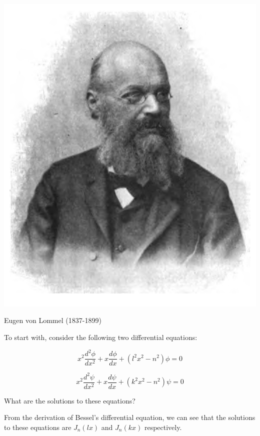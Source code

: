 \begin{marginfigure}[-.0cm]
  \includegraphics{bessel/figures/e_lommel}
  \caption{Eugen von Lommel (1837-1899)}
\end{marginfigure}

To start with, consider the following two differential equations:

\begin{equation}
x^2 \frac{d^2 \phi}{dx^2}  + x \frac{d \phi}{dx} + \left(l^2x^2 - n^2\right) \phi = 0 \label{eq-bessel-orth-1}
\end{equation} 

\begin{equation}
x^2 \frac{d^2 \psi}{dx^2}  + x \frac{d \psi}{dx} + \left(k^2x^2 - n^2\right) \psi = 0 \label{eq-bessel-orth-2}
\end{equation}

\begin{cue}
What are the solutions to these equations?  
\end{cue}

From the derivation of Bessel's differential equation, we can see that the solutions to these equations are $J_n(lx)$ and $J_n(kx)$ respectively.

